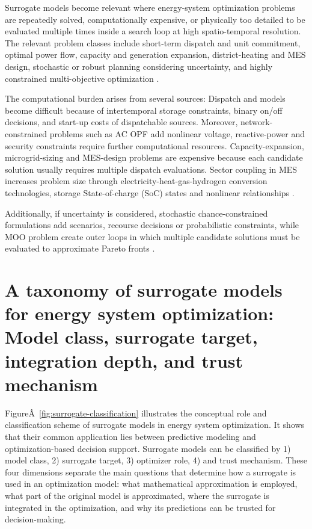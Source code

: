 \documentclass[final,5p,times,twocolumn]{elsarticle}
\begin{document}
Surrogate models become relevant where energy-system optimization
problems are repeatedly solved, computationally expensive, or physically
too detailed to be evaluated multiple times inside a search loop at high
spatio-temporal resolution. The relevant problem classes include
short-term dispatch and unit commitment, optimal power flow, capacity
and generation expansion, district-heating and MES design, stochastic or
robust planning considering uncertainty, and highly constrained
multi-objective optimization
\cite{Wu2022231,Chen20244723,Chen2022,Muhlpfordt20194806,Deng2020831,Khaloie2025,Rodgers2018951,Han2018622,Hirvonen2017323,Zhou20181}.

The computational burden arises from several sources: Dispatch and
models become difficult because of intertemporal storage constraints,
binary on/off decisions, and start-up costs of dispatchable sources.
Moreover, network-constrained problems such as AC OPF add nonlinear
voltage, reactive-power and security constraints require further
computational resources. Capacity-expansion, microgrid-sizing and
MES-design problems are expensive because each candidate solution
usually requires multiple dispatch evaluations. Sector coupling in MES
increases problem size through electricity-heat-gas-hydrogen conversion
technologies, storage State-of-charge (SoC) states and nonlinear
relationships
\cite{Safta20172535,Pang2023,Su2022315,Chen2023657,Koirala20242284,Zheng20231907,Ren2024,Jalving2023,Dong2023,Yin2024}.

Additionally, if uncertainty is considered, stochastic
chance-constrained formulations add scenarios, recourse decisions or
probabilistic constraints, while MOO problem create outer loops in which
multiple candidate solutions must be evaluated to approximate Pareto
fronts
\cite{Hu2020,Hu2021671,Volodina2022,Liang20246508,Thrampoulidis2021,Hussien20211883,Schulte2020,Han2018622}.

\section{A taxonomy of surrogate models for energy system optimization: Model class, surrogate target, integration depth, and trust mechanism}
\label{sec:taxonomy}

FigureÂ~\ref{fig:surrogate-classification} illustrates the conceptual
role and classification scheme of surrogate models in energy system
optimization. It shows that their common application lies between
predictive modeling and optimization-based decision support. Surrogate
models can be classified by 1) model class, 2) surrogate target, 3)
optimizer role, 4) and trust mechanism. These four dimensions separate
the main questions that determine how a surrogate is used in an
optimization model: what mathematical approximation is employed, what
part of the original model is approximated, where the surrogate is
integrated in the optimization, and why its predictions can be trusted
for decision-making.
\end{document}
